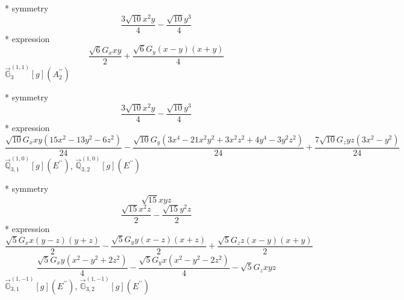 \documentclass[fleqn,8pt]{jsarticle}
\begin{document}
\noindent\quad ** symmetry
\begin{dmath*}
\frac{3 \sqrt{10} x^{2} y}{4} - \frac{\sqrt{10} y^{3}}{4}
\end{dmath*}
\noindent\quad ** expression
\begin{dmath*}
\frac{\sqrt{6} G_{x} x y}{2} + \frac{\sqrt{6} G_{y} \left(x - y\right) \left(x + y\right)}{4}
\end{dmath*}
\noindent\quad $\vec{\mathbb{G}}_{3}^{(1,1)}[g](A_{2}^{\prime\prime})$

\noindent\quad ** symmetry
\begin{dmath*}
\frac{3 \sqrt{10} x^{2} y}{4} - \frac{\sqrt{10} y^{3}}{4}
\end{dmath*}
\noindent\quad ** expression
\begin{dmath*}
\frac{\sqrt{10} G_{x} x y \left(15 x^{2} - 13 y^{2} - 6 z^{2}\right)}{24} - \frac{\sqrt{10} G_{y} \left(3 x^{4} - 21 x^{2} y^{2} + 3 x^{2} z^{2} + 4 y^{4} - 3 y^{2} z^{2}\right)}{24} + \frac{7 \sqrt{10} G_{z} y z \left(3 x^{2} - y^{2}\right)}{24}
\end{dmath*}
\noindent\quad $\vec{\mathbb{Q}}_{3,1}^{(1,0)}[g](E^{\prime\prime})$, $\vec{\mathbb{Q}}_{3,2}^{(1,0)}[g](E^{\prime\prime})$

\noindent\quad ** symmetry
\begin{dmath*}
\sqrt{15} x y z
\end{dmath*}
\begin{dmath*}
\frac{\sqrt{15} x^{2} z}{2} - \frac{\sqrt{15} y^{2} z}{2}
\end{dmath*}
\noindent\quad ** expression
\begin{dmath*}
\frac{\sqrt{5} G_{x} x \left(y - z\right) \left(y + z\right)}{2} - \frac{\sqrt{5} G_{y} y \left(x - z\right) \left(x + z\right)}{2} + \frac{\sqrt{5} G_{z} z \left(x - y\right) \left(x + y\right)}{2}
\end{dmath*}
\begin{dmath*}
\frac{\sqrt{5} G_{x} y \left(x^{2} - y^{2} + 2 z^{2}\right)}{4} - \frac{\sqrt{5} G_{y} x \left(x^{2} - y^{2} - 2 z^{2}\right)}{4} - \sqrt{5} G_{z} x y z
\end{dmath*}
\noindent\quad $\vec{\mathbb{G}}_{3,1}^{(1,-1)}[g](E^{\prime\prime})$, $\vec{\mathbb{G}}_{3,2}^{(1,-1)}[g](E^{\prime\prime})$
\end{document}
